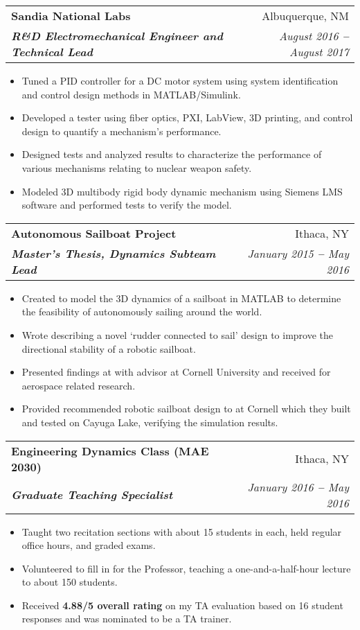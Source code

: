 \documentclass[letterpaper,11pt]{article}
\makeatletter
\newcommand{\resumeItem}[1]{
  \item\small{
    {#1}
  }
}
\newcommand{\resumeSubheading}[4]{
  \item
    \begin{tabular*}{1\textwidth}[t]{l@{\extracolsep{\fill}}r}
      \textbf{#1} & #2 \\
      \textit{\textbf{\small#3}} & \textit{\small #4} \\
    \end{tabular*}
}
\newcommand{\resumeItemListStart}{\begin{itemize}[leftmargin=15pt]}
\newcommand{\resumeItemListEnd}{\end{itemize}}
\newcommand{\bref}[2]{\href{#1}{\color{blue}{#2}}}
\makeatother
\begin{document}
\resumeSubheading
{Sandia National Labs}{Albuquerque, NM}
{R\&D Electromechanical Engineer and Technical Lead}{August 2016 \textbf{--} August 2017}
\resumeItemListStart
\resumeItem{Tuned a PID controller for a DC motor system using system identification and control design methods in MATLAB/Simulink.}
\resumeItem{Developed a tester using fiber optics, PXI, LabView, 3D printing, and control design to quantify a mechanism’s performance.}
\resumeItem{Designed tests and analyzed results to characterize the performance of various mechanisms relating to nuclear weapon safety.}
\resumeItem{Modeled 3D multibody rigid body dynamic mechanism using Siemens LMS software and performed tests to verify the model.}
\resumeItemListEnd

\resumeSubheading
{Autonomous Sailboat Project}{Ithaca, NY}
{Master’s Thesis, Dynamics Subteam Lead}{January 2015 \textbf{--} May 2016}
\resumeItemListStart
\resumeItem{Created \bref{https://github.com/jam643/SailboatSim3D/tree/master}{a simulation framework} to model the 3D dynamics of a sailboat in MATLAB to determine the feasibility of autonomously sailing around the world.}
\resumeItem{Wrote \bref{https://bpb-us-w2.wpmucdn.com/sites.coecis.cornell.edu/dist/5/91/files/2017/06/Semester-Report-Spring-2016-Jesse-Miller-1e485cb.pdf}{a thesis paper} describing a novel ‘rudder connected to sail’ design to improve the directional stability of a robotic sailboat.}
\resumeItem{Presented findings at \bref{https://robotics.cornell.edu/2019/08/14/a-directionally-self-stable-robotic-sail-boat-concept-and-simulations/}{a robotics seminar} with advisor \bref{http://ruina.tam.cornell.edu/}{Andy Ruina} at Cornell University and received \bref{https://www.mae.cornell.edu/news/sibley-school-mechanical-aerospace-engineering-student-awards-0}{the Kelly Prize} for aerospace related research.}
\resumeItem{Provided recommended robotic sailboat design to \bref{https://cusail.com/}{CUSail project team} at Cornell which they built and tested on Cayuga Lake, verifying the simulation results.}
\resumeItemListEnd

\resumeSubheading
{Engineering Dynamics Class (MAE 2030)}{Ithaca, NY}
{Graduate Teaching Specialist}{January 2016 \textbf{--} May 2016}
\resumeItemListStart
\resumeItem{Taught two recitation sections with about 15 students in each, held regular office hours, and graded exams.}
\resumeItem{Volunteered to fill in for the Professor, teaching a one-and-a-half-hour lecture to about 150 students.}
\resumeItem{Received \textbf{4.88/5 overall rating} on my TA evaluation based on 16 student responses and was nominated to be a TA trainer.}
\resumeItemListEnd
\end{document}
